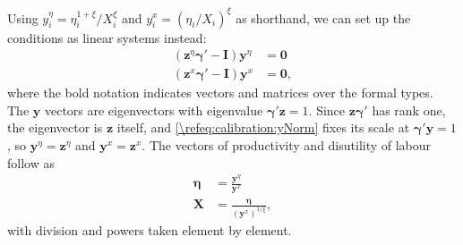 Using $y_i^{\eta} = \eta_i^{1+\xi}/X_i^{\xi}$ and $y_i^x = (\eta_i/X_i)^{\xi}$ as shorthand, we can set up the conditions as linear systems instead:
\begin{align*}
    \left(\bm{z}^{\eta} \bm{\gamma}'-\bm{I}\right)\bm{y}^{\eta} &= \bm{0} \\
    \left(\bm{z}^{x} \bm{\gamma}'-\bm{I}\right) \bm{y}^{x} &= \bm{0},
\end{align*}
where the bold notation indicates vectors and matrices over the formal types. The $\bm{y}$ vectors are eigenvectors with eigenvalue $\bm{\gamma}'\bm{z} = 1$. Since $\bm{z}\bm{\gamma}'$ has rank one, the eigenvector is $\bm{z}$ itself, and \eqref{\refeq:calibration:yNorm} fixes its scale at $\bm{\gamma}'\bm{y} = 1$, so $\bm{y}^{\eta} = \bm{z}^{\eta}$ and $\bm{y}^{x} = \bm{z}^{x}$. The vectors of productivity and disutility of labour follow as
\begin{align}
    \bm{\eta} &= \frac{\bm{y}^{\eta}}{\bm{y}^x} \label{\refeq:calibration:etai} \\
    \bm{X} &= \frac{\bm{\eta}}{(\bm{y}^x)^{1/\xi}}, \label{\refeq:calibration:Xi}
\end{align}
with division and powers taken element by element.

